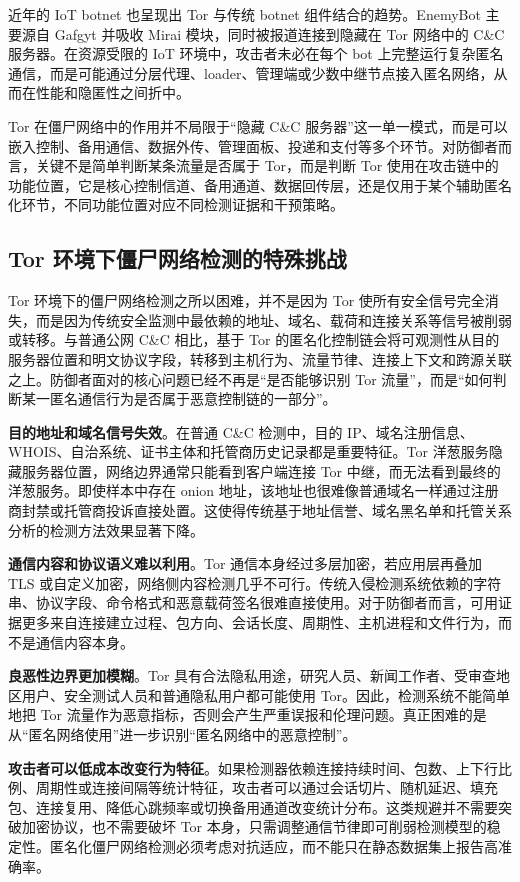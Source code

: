 近年的 IoT botnet 也呈现出 Tor 与传统 botnet 组件结合的趋势。EnemyBot 主要源自 Gafgyt 并吸收 Mirai 模块，同时被报道连接到隐藏在 Tor 网络中的 C\&C 服务器\cite{fortinet2022enemybot}。在资源受限的 IoT 环境中，攻击者未必在每个 bot 上完整运行复杂匿名通信，而是可能通过分层代理、loader、管理端或少数中继节点接入匿名网络，从而在性能和隐匿性之间折中。

Tor 在僵尸网络中的作用并不局限于“隐藏 C\&C 服务器”这一单一模式，而是可以嵌入控制、备用通信、数据外传、管理面板、投递和支付等多个环节。对防御者而言，关键不是简单判断某条流量是否属于 Tor，而是判断 Tor 使用在攻击链中的功能位置，它是核心控制信道、备用通道、数据回传层，还是仅用于某个辅助匿名化环节，不同功能位置对应不同检测证据和干预策略。

\subsection{Tor 环境下僵尸网络检测的特殊挑战}
\label{subsec:tor_detection_challenges}

Tor 环境下的僵尸网络检测之所以困难，并不是因为 Tor 使所有安全信号完全消失，而是因为传统安全监测中最依赖的地址、域名、载荷和连接关系等信号被削弱或转移。与普通公网 C\&C 相比，基于 Tor 的匿名化控制链会将可观测性从目的服务器位置和明文协议字段，转移到主机行为、流量节律、连接上下文和跨源关联之上。防御者面对的核心问题已经不再是“是否能够识别 Tor 流量”，而是“如何判断某一匿名通信行为是否属于恶意控制链的一部分”。

\textbf{目的地址和域名信号失效}。在普通 C\&C 检测中，目的 IP、域名注册信息、WHOIS、自治系统、证书主体和托管商历史记录都是重要特征。Tor 洋葱服务隐藏服务器位置，网络边界通常只能看到客户端连接 Tor 中继，而无法看到最终的洋葱服务。即使样本中存在 onion 地址，该地址也很难像普通域名一样通过注册商封禁或托管商投诉直接处置。这使得传统基于地址信誉、域名黑名单和托管关系分析的检测方法效果显著下降。

\textbf{通信内容和协议语义难以利用}。Tor 通信本身经过多层加密，若应用层再叠加 TLS 或自定义加密，网络侧内容检测几乎不可行。传统入侵检测系统依赖的字符串、协议字段、命令格式和恶意载荷签名很难直接使用。对于防御者而言，可用证据更多来自连接建立过程、包方向、会话长度、周期性、主机进程和文件行为，而不是通信内容本身。

\textbf{良恶性边界更加模糊}。Tor 具有合法隐私用途，研究人员、新闻工作者、受审查地区用户、安全测试人员和普通隐私用户都可能使用 Tor。因此，检测系统不能简单地把 Tor 流量作为恶意指标，否则会产生严重误报和伦理问题。真正困难的是从“匿名网络使用”进一步识别“匿名网络中的恶意控制”。

\textbf{攻击者可以低成本改变行为特征}。如果检测器依赖连接持续时间、包数、上下行比例、周期性或连接间隔等统计特征，攻击者可以通过会话切片、随机延迟、填充包、连接复用、降低心跳频率或切换备用通道改变统计分布。这类规避并不需要突破加密协议，也不需要破坏 Tor 本身，只需调整通信节律即可削弱检测模型的稳定性。匿名化僵尸网络检测必须考虑对抗适应，而不能只在静态数据集上报告高准确率。

